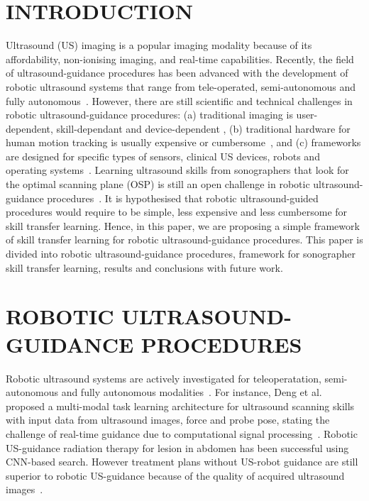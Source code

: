 \documentclass[a4paper, 10pt, conference]{ieeeconf}      %
\begin{document}
\section{INTRODUCTION}
Ultrasound (US) imaging is a popular imaging modality because of its affordability, 
non-ionising imaging, and real-time capabilities.
Recently, the field of ultrasound-guidance procedures has been advanced with the development of robotic ultrasound systems that range from tele-operated, semi-autonomous and fully autonomous~\cite{deng2021, vonHaxthausen2021, Gerlach2022}. 
However, there are still scientific and technical challenges in robotic ultrasound-guidance procedures: 
(a) traditional imaging is user-dependent, skill-dependant and device-dependent \cite{chen1997},
(b) traditional hardware for human motion tracking is usually expensive or cumbersome~\cite{Dressler2021}, and 
(c) frameworks are designed for specific types of sensors, clinical US devices, robots and operating systems~\cite{niu2022}.
Learning ultrasound skills from sonographers that look for the optimal scanning plane (OSP) is still an open challenge in robotic ultrasound-guidance procedures~\cite{deng2021}.
It is hypothesised that robotic ultrasound-guided procedures would require to be simple, less expensive and less cumbersome for skill transfer learning.
Hence, in this paper, we are proposing a simple framework of skill transfer learning for robotic ultrasound-guidance procedures.
This paper is divided into robotic ultrasound-guidance procedures, framework for sonographer skill transfer learning, results and conclusions with future work.

\section{ROBOTIC ULTRASOUND-GUIDANCE PROCEDURES}
Robotic ultrasound systems are actively investigated for teleoperatation, semi-autonomous and fully autonomous modalities~\cite{vonHaxthausen2021}.
For instance, Deng et al. proposed a multi-modal task learning architecture for ultrasound scanning skills with input data from ultrasound images, force and probe pose, stating the challenge of real-time guidance due to computational signal processing~\cite{deng2021}.
Robotic US-guidance radiation therapy for lesion in abdomen has been successful using CNN-based search.
However treatment plans without US-robot guidance are still superior to robotic US-guidance because of the quality of acquired ultrasound images~\cite{Gerlach2022}. 
\end{document}
